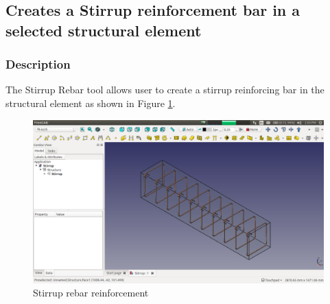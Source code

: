 \subsection{Creates a Stirrup reinforcement bar in a selected structural element}
\subsubsection{Description}
The Stirrup Rebar tool allows user to create a stirrup reinforcing bar in the structural element as shown in Figure \ref{stirruprebar}.
\begin{figure}
    \centering \includegraphics[scale=0.35]{images/Stirrup.png}
    \caption{Stirrup rebar reinforcement}
    \label{stirruprebar}
\end{figure}
